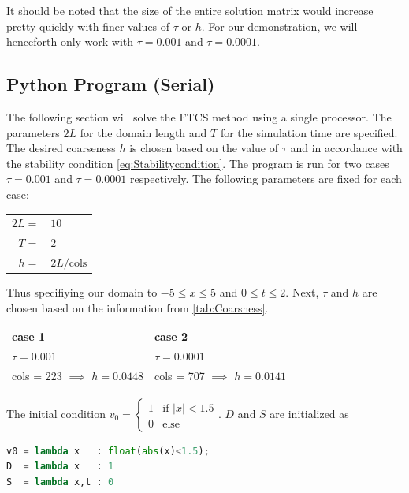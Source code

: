 It should be noted that the size of the entire solution matrix would increase pretty quickly with finer values of $\tau$ or $h$. For our demonstration, we will henceforth only work with $\tau = 0.001$ and $\tau=0.0001$.

\subsection{Python Program (Serial)}
The following section will solve the FTCS method using a single processor. The parameters $2L$ for the domain length and $T$ for the simulation time are specified. The desired coarseness $h$ is chosen based on the value of $\tau$ and in accordance with the stability condition \autoref{eq:Stabilitycondition}. The program is run for two cases $\tau = 0.001$ and $\tau=0.0001$ respectively. The following parameters are fixed for each case:

\begin{table}[h]
    \renewcommand{\arraystretch}{1}
\begin{tabular}{rl}
    $2L =$&$10$ \\
    $T =$&$2$ \\
    $h =$&$2L/\text{cols}$
\end{tabular}
\end{table}

Thus specifiying our domain to $-5\leq x \leq 5$ and $0\leq t \leq 2$. Next, $\tau$ and $h$ are chosen based on the information from \autoref{tab:Coarsness}.
\begin{table}[h]
    \centering
    \renewcommand{\arraystretch}{1}
\begin{tabular}{l|l}
    \textbf{case 1}  & \textbf{case 2} \\ 
    $\tau = 0.001$ & $\tau = 0.0001$\\
    cols = 223 $\implies$ $h=0.0448$  & cols = 707 $\implies$ $h=0.0141$
\end{tabular}
\end{table}


\vspace{1mm}
The initial condition
$v_0 = 
\begin{cases}
1 & \text{if } |x|<1.5 \\
0 & \text{else }
\end{cases}
$. $D$ and $S$ are initialized as
\begin{lstlisting}[language=Python]
v0 = lambda x   : float(abs(x)<1.5);
D  = lambda x   : 1 
S  = lambda x,t : 0 
\end{lstlisting}

